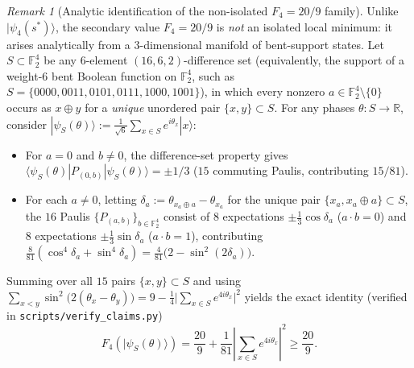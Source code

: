 \documentclass[11pt,a4paper]{article}
\theoremstyle{plain}
\theoremstyle{definition}
\theoremstyle{remark}
\newtheorem{remark}[lemma]{Remark}
\newcommand{\R}{\mathbb{R}}
\newcommand{\F}{\mathbb{F}}
\newcommand{\ket}[1]{|#1\rangle}
\newcommand{\expval}[2]{\langle#1|#2|#1\rangle}
\newcommand{\abs}[1]{\lvert#1\rvert}
\numberwithin{equation}{section}
\begin{document}
\begin{remark}[Analytic identification of the non-isolated $F_4 = 20/9$ family]\label{rem:bent-family}
Unlike $\ket{\psi_4(s^*)}$, the secondary value $F_4 = 20/9$ is \emph{not} an isolated local minimum: it arises analytically from a $3$-dimensional manifold of bent-support states. Let $S \subset \F_2^4$ be any $6$-element $(16, 6, 2)$-difference set (equivalently, the support of a weight-$6$ bent Boolean function on $\F_2^4$, such as $S = \{0000, 0011, 0101, 0111, 1000, 1001\}$), in which every nonzero $a \in \F_2^4 \setminus \{0\}$ occurs as $x \oplus y$ for a \emph{unique} unordered pair $\{x, y\} \subset S$. For any phases $\theta : S \to \R$, consider $\ket{\psi_S(\theta)} := \frac{1}{\sqrt{6}} \sum_{x \in S} e^{i\theta_x}\ket{x}$:
\begin{itemize}[leftmargin=1.8em]
  \item For $a = 0$ and $b \neq 0$, the difference-set property gives $\expval{\psi_S(\theta)}{P_{(0,b)}} = \pm 1/3$ ($15$ commuting Paulis, contributing $15/81$).
  \item For each $a \neq 0$, letting $\delta_a := \theta_{x_a \oplus a} - \theta_{x_a}$ for the unique pair $\{x_a, x_a \oplus a\} \subset S$, the $16$ Paulis $\{P_{(a,b)}\}_{b \in \F_2^4}$ consist of $8$ expectations $\pm \frac{1}{3}\cos\delta_a$ ($a \cdot b = 0$) and $8$ expectations $\pm \frac{1}{3}\sin\delta_a$ ($a \cdot b = 1$), contributing $\frac{8}{81}(\cos^4\delta_a + \sin^4\delta_a) = \frac{4}{81}\bigl(2 - \sin^2(2\delta_a)\bigr)$.
\end{itemize}
Summing over all $15$ pairs $\{x, y\} \subset S$ and using $\sum_{x < y}\sin^2\bigl(2(\theta_x - \theta_y)\bigr) = 9 - \frac{1}{4}\abs{\sum_{x \in S} e^{4i\theta_x}}^2$ yields the exact identity (verified in \texttt{\small scripts/\allowbreak verify\_claims.py})
\[
  F_4(\ket{\psi_S(\theta)}) = \frac{20}{9} + \frac{1}{81}\left\lvert \sum_{x \in S} e^{4i\theta_x} \right\rvert^2 \ge \frac{20}{9}.
\]

\end{remark}
\end{document}

